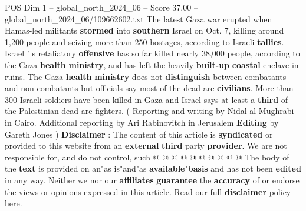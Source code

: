 \begin{textsample}{POS Dim 1 – global\_north\_2024\_06 – Score 37.00 – global\_north\_2024\_06/109662602.txt}
The latest Gaza war erupted when Hamas-led militants \textbf{stormed} into \textbf{southern} Israel on Oct. 7, killing around 1,200 people and seizing more than 250 hostages, according to Israeli \textbf{tallies}.
Israel ' s retaliatory \textbf{offensive} has so far killed nearly 38,000 people, according to the Gaza \textbf{health} \textbf{ministry}, and has left the heavily \textbf{built-up} \textbf{coastal} enclave in ruins.
The Gaza \textbf{health} \textbf{ministry} does not \textbf{distinguish} between combatants and non-combatants but officials say most of the dead are \textbf{civilians}.
More than 300 Israeli soldiers have been killed in Gaza and Israel says at least a \textbf{third} of the Palestinian dead are fighters. ( Reporting and writing by Nidal al-Mughrabi in Cairo.
Additional reporting by Ari Rabinovitch in Jerusalem \textbf{Editing} by Gareth Jones ) \textbf{Disclaimer} : The content of this article is \textbf{syndicated} or provided to this website from an \textbf{external} \textbf{third} party \textbf{provider}.
We are not responsible for, and do not control, such @ @ @ @ @ @ @ @ @ @ The body of the \textbf{text} is provided on an"as is"and"as \textbf{available}"\textbf{basis} and has not been \textbf{edited} in any way.
Neither we nor our \textbf{affiliates} \textbf{guarantee} the \textbf{accuracy} of or endorse the views or opinions expressed in this article.
Read our full \textbf{disclaimer} policy here.

\end{textsample}
